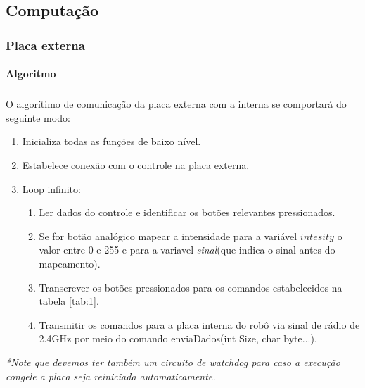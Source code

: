 \documentclass{article}
\begin{document}
        \subsection{Computação}
            \subsubsection{Placa externa}
                \paragraph{Algoritmo}
                \label{sec:1}
                \subparagraph{}
                O algorítimo de comunicação da placa externa com a interna se comportará do seguinte modo:
                \begin{enumerate}
                    \item Inicializa todas as funções de baixo nível.
                    \item Estabelece conexão com o controle na placa externa.
                    \item Loop infinito:
                    \begin{enumerate}
                        \item Ler dados do controle e identificar os botões relevantes pressionados.
                        \item Se for botão analógico mapear a intensidade para a variável $\textit{intesity}$ o valor entre 0 e 255 e para a variavel \textit{sinal}(que indica o sinal antes do mapeamento).
                        \item Transcrever os botões pressionados para os comandos estabelecidos na tabela \ref{tab:1}.
                        \item Transmitir os comandos para a placa interna do robô via sinal de rádio de 2.4GHz por meio do comando enviaDados(int Size, char byte...).
                    \end{enumerate}
                \end{enumerate}
                \textit{*Note que devemos ter também um circuito de watchdog para caso a execução congele a placa seja reiniciada automaticamente.}
\end{document}
